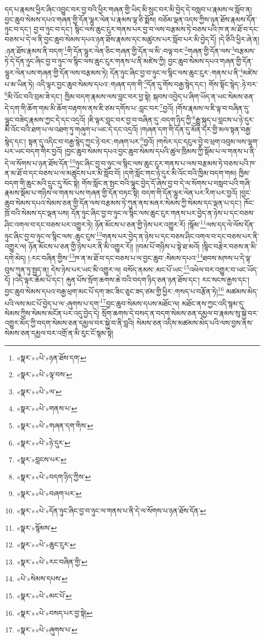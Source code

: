 དད་པ་རྣམས་ཕྱིར་ཞིང་འབྱུང་བར་བྱ་བའི་ཕྱིར་གཞན་གྱི་ཡིད་མི་སྲུང་བར་མི་བྱེད་དེ་བསླབ་པ་རྣམས་ལ་སློབ་ན། བྱང་ཆུབ་སེམས་དཔའ་གཞན་གྱི་དོན་ལྷུར་ལེན་པ་རྣམས་ལྟ་ཅི་སྨོས། བཅོམ་ལྡན་འདས་ཀྱིས་ཉན་ཐོས་རྣམས་དོན་ཉུང་བ་དང་། བྱ་བ་ཉུང་བ་དང་། སྙིང་ལས་ཆུང་ངུར་གནས་པར་བྱ་བ་ལས་བརྩམས་ཏེ་བཅས་པའི་ཁ་ན་མ་ཐོ་བ་དང་བཅས་པ་དེ་ལ་ནི་བྱང་ཆུབ་སེམས་དཔའ་ཉན་ཐོས་རྣམས་དང་མཚུངས་པར་སློབ་པར་མི་བྱེད་དོ། །དེ་ཅིའི་ཕྱིར་ཞེ་ན། :ཉན་ཐོས་རྣམས་ནི་བདག་\footnote{«སྣར་»«པེ་»ཉན་ཐོས་དག་}གི་དོན་ལྷུར་ལེན་ཅིང་གཞན་གྱི་དོན་ལ་མི་:བལྟ་བར་\footnote{«སྣར་»«པེ་»ལྟ་བས་}གཞན་གྱི་དོན་ལས་\footnote{«སྣར་»«པེ་»ལ་}བརྩམས་ཏེ་དེ་དོན་ཉུང་ཞིང་བྱ་བ་ཉུང་ལ་སྙིང་ལས་ཆུང་ངུར་གནས་པ་ནི་མཛེས་ཀྱི། བྱང་ཆུབ་སེམས་དཔའ་གཞན་གྱི་དོན་ལྷུར་ལེན་པས་གཞན་གྱི་དོན་ལས་བརྩམས་ཏེ། དོན་ཉུང་ཞིང་བྱ་བ་ཉུང་ལ་སྙིང་ལས་ཆུང་ངུར་:གནས་པ་ནི་\footnote{«སྣར་»«པེ་»གནས་པ་}མཛེས་པ་མ་ཡིན་ཏེ། འདི་ལྟར་བྱང་ཆུབ་སེམས་དཔའ་:གཞན་དག་གི་\footnote{«སྣར་»«པེ་»གཞན་དག་གིས་}དོན་དུ་གོས་བརྒྱ་སྙེད་དང་། གོས་སྟོང་སྙེད་:ཉེ་བར་\footnote{«སྣར་»«པེ་»ཉེ་དུར་}མི་འོང་བའི་བྲམ་ཟེ་དང་། ཁྱིམ་བདག་རྣམས་ལས་བླང་བར་བྱ་སྟེ། སྐབས་འབྱེད་པ་ཞིག་ཡོད་ན་ཡང་སེམས་ཅན་དེ་དག་གི་ཆོག་གམ་མི་ཆོག་བརྟགས་ནས་ཇི་ཙམ་དགོས་པ་:བླང་བར་\footnote{«སྣར་»བླངས་པར་}བྱའོ། །གོས་རྣམས་ལ་ཇི་ལྟ་བ་བཞིན་དུ་ལྷུང་བཟེད་རྣམས་ཀྱང་དེ་དང་འདྲའོ། །ཇི་ལྟར་བླང་བར་བྱ་བ་བཞིན་དུ་:བདག་ཉིད་ཀྱི་\footnote{«སྣར་»«པེ་»བདག་ཉིད་ཀྱིས་}རྒྱུ་སྐུད་པ་བླངས་པ་ཉེ་དུར་མི་འོང་བའི་ཐག་པ་ལ་འཐག་ཏུ་གཞུག་པ་ཡང་དེ་དང་འདྲའོ། །གཞན་དག་གི་དོན་དུ་མོན་དར་གྱི་མལ་སྟན་བརྒྱ་སྙེད་དང་། སྟན་དུ་འདིང་བ་བརྒྱ་སྙེད་ཀྱང་ཉེ་བར་:གཞག་པར་\footnote{«སྣར་»«པེ་»བཞག་པར་}བྱའོ། །གསེར་དང་དངུལ་བྱེ་བ་ཕྲག་འབུམ་ལས་ལྷག་པར་ཡང་བདག་གིར་བྱའོ། །བྱང་ཆུབ་སེམས་དཔའ་བྱང་ཆུབ་སེམས་དཔའི་ཚུལ་ཁྲིམས་ཀྱི་སྡོམ་པ་ལ་གནས་པ་ནི་དེ་ལ་སོགས་པ་ཉན་ཐོས་དོན་\footnote{«སྣར་»«པེ་»དོན་ཉུང་ཞིང་བྱ་བ་ཉུང་ལ་གནས་པ་ནི་དེ་ལ་སོགས་པ་ཉན་ཐོས་དོན་}ཉུང་ཞིང་བྱ་བ་ཉུང་ལ་སྙིང་ལས་ཆུང་ངུར་གནས་པ་ལས་བརྩམས་ཏེ་བཅས་པའི་ཁ་ན་མ་ཐོ་བ་དང་བཅས་པ་ལ་མཚུངས་པར་མི་སློབ་བོ། །དགེ་སློང་གང་ཉེ་དུར་མི་འོང་བའི་ཁྱིམ་བདག་གམ། ཁྱིམ་བདག་གི་ཆུང་མའི་དྲུང་དུ་སོང་སྟེ། གོས་སློང་ན་སྤང་བའི་ལྟུང་བྱེད་དོ་ཞེས་བྱ་བ་དེ་ལ་སོགས་པ་བསླབ་པའི་གཞི་རྣམས་སྡོམ་པ་གཉིས་ལ་གནས་པས་གཞན་གྱི་དོན་བཏང་སྟེ། བདག་གི་དོན་ལྷུར་ལེན་པར་རིག་པར་བྱའོ། །བྱང་ཆུབ་སེམས་དཔའ་སེམས་ཅན་གྱི་དོན་ལས་བརྩམས་ཏེ་ཀུན་ནས་མནར་སེམས་ཀྱི་སེམས་དང་ལྡན་པ་དང་། ཁོང་ཁྲོ་བའི་སེམས་དང་ལྡན་པས། དོན་ཉུང་ཞིང་བྱ་བ་ཉུང་ལ་སྙིང་ལས་ཆུང་ངུར་གནས་པར་བྱེད་ན་ཉེས་པ་དང་བཅས་ཤིང་འགལ་བ་དང་བཅས་པར་འགྱུར་ཏེ། ཉོན་མོངས་པ་ཅན་གྱི་ཉེས་པར་འགྱུར་རོ། །སྙོམ་\footnote{«སྣར་»སྙོམས་}ལས་དད་ལེ་ལོས་དོན་ཉུང་ཞིང་བྱ་བ་ཉུང་ལ་སྙིང་ལས་:ཆུང་ངུས་\footnote{«སྣར་»«པེ་»ཆུང་ངུར་}གནས་པར་བྱེད་ན་ཉེས་པ་དང་བཅས་ཤིང་འགལ་བ་དང་བཅས་པར་ནི་འགྱུར་ལ། ཉོན་མོངས་པ་ཅན་གྱི་ཉེས་པར་ནི་མི་འགྱུར་རོ།། །།བམ་པོ་གཉིས་པ་སྟེ་ཐ་མའོ། །སྙིང་བརྩེར་བཅས་ན་མི་དགེ་མེད། །:རང་བཞིན་གྱིས་\footnote{«སྣར་»«པེ་»རང་བཞིན་གྱི་}ཁ་ན་མ་ཐོ་བ་དང་བཅས་པ་ལ་བྱང་ཆུབ་:སེམས་དཔའ་\footnote{«པེ་»སེམས་དཔས་}ཐབས་མཁས་པ་དེ་ལྟ་བུས་ཀུན་ཏུ་སྤྱད་ན། དེས་ཉེས་པར་ཡང་མི་འགྱུར་ལ། བསོད་ནམས་:མང་པོ་ཡང་\footnote{«སྣར་»«པེ་»མང་པོ་}འཕེལ་བར་འགྱུར་བ་ཡང་ཡོད་དོ། །འདི་ལྟར་ཆོམ་པོ་དང་། རྐུན་པོས་སྲོག་ཆགས་ཆེ་བའི་བདག་ཉིད་ཅན་ཉན་ཐོས་དང་། རང་སངས་རྒྱས་དང་། བྱང་ཆུབ་སེམས་དཔའ་བརྒྱ་ཕྲག་མང་པོ་དག་ཟང་ཟིང་ཅུང་ཟད་ཙམ་གྱི་ཕྱིར་:གསད་པ་བརྩོན་ཏེ།\footnote{«སྣར་»«པེ་»བསད་པར་བྱ་སྟེ།} མཚམས་མེད་པའི་ལས་མང་པོ་བྱེད་པ་ལ་:ཞུགས་པ་དག་\footnote{«སྣར་»«པེ་»ཞུགས་པ་}བྱང་ཆུབ་སེམས་དཔས་མཐོང་ལ། མཐོང་ནས་ཀྱང་འདི་སྙམ་དུ་སེམས་ཀྱིས་སེམས་མངོན་པར་འདུ་བྱེད་དེ། སྲོག་ཆགས་དེ་བསད་ན་བདག་སེམས་ཅན་དམྱལ་བ་རྣམས་སུ་སྐྱེ་བར་འགྱུར་མོད་ཀྱི་བདག་སེམས་ཅན་དམྱལ་བར་སྐྱེ་བ་ནི་བླའི། སེམས་ཅན་འདིས་མཚམས་མེད་པའི་ལས་བྱས་ནས་སེམས་ཅན་དམྱལ་བར་འགྲོ་ན་མི་རུང་ངོ་སྙམ་སྟེ། 